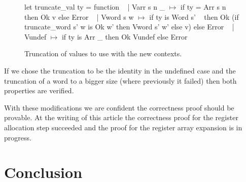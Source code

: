 \documentclass{article}
\begin{document}
\begin{figure}[t]
\obeylines\obeyspaces\ttfamily%
let truncate\_val ty = function
~ | Varr s n \_ \(\mapsto\) if ty = Arr s n then Ok v else Error
~ | Vword s w  \(\mapsto\) if ty is Word s'
~   then Ok (if truncate\_word s' w is Ok w' then Vword s' w' else v) else Error
~ | Vundef     \(\mapsto\) if ty is Arr \_ then Ok Vundef else Error
\normalfont%
\caption{Truncation of values to use with the new contexts.}
\end{figure}

If we chose the truncation to be the identity in the undefined case and the
truncation of a word to a bigger size (where previously it failed) then both
properties are verified.

\medskip

With these modifications we are confident the correctness proof should be
provable. At the writing of this article the correctness proof for the register
allocation step succeeded and the proof for the register array expansion is in
progress.

\section{Conclusion}\label{sec:ccl}
\end{document}
